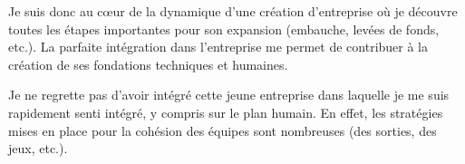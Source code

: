 Je suis donc au cœur de la dynamique d'une création d'entreprise où je découvre
toutes les étapes importantes pour son expansion (embauche, levées de fonds,
etc.). La parfaite intégration dans l'entreprise me permet de contribuer à la
création de ses fondations techniques et humaines.

Je ne regrette pas d'avoir intégré cette jeune entreprise dans laquelle je
me suis rapidement senti intégré, y compris sur le plan humain. En effet, les
stratégies mises en place pour la cohésion des équipes sont nombreuses (des
sorties, des jeux, etc.).

